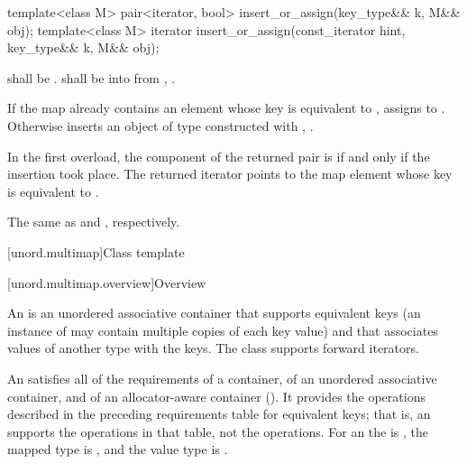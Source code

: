 %
\begin{itemdecl}
template<class M>
  pair<iterator, bool> insert_or_assign(key_type&& k, M&& obj);
template<class M>
  iterator insert_or_assign(const_iterator hint, key_type&& k, M&& obj);
\end{itemdecl}

\begin{itemdescr}
\pnum
\requires
{} shall be .
 shall be  into 
from , .

\pnum
\effects
If the map already contains an element 
whose key is equivalent to ,
assigns  to .
Otherwise inserts an object of type 
constructed with , .

\pnum
\returns
In the first overload,
the  component of the returned pair is 
if and only if the insertion took place.
The returned iterator points to the map element
whose key is equivalent to .

\pnum
\complexity
The same as  and ,
respectively.
\end{itemdescr}

[unord.multimap]{Class template }%

[unord.multimap.overview]{Overview}

\pnum
{}%
%
An  is an unordered associative container
that supports equivalent keys (an instance of  may contain
multiple copies of each key value) and that associates values of
another type  with the keys.
The  class
supports forward iterators.

\pnum
An  satisfies all of the requirements of a container, of an
unordered associative container, and of an allocator-aware container
(). It provides the operations described in the
preceding requirements table for equivalent keys; that is, an 
supports the  operations in that table, not the  operations.
For an  the  is , the
mapped type is , and the value type is .


